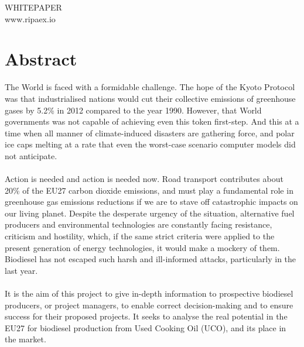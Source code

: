 \documentclass[11pt,fleqn]{book} %
\begin{document}

\begingroup
\thispagestyle{empty}
\vfill
\vfill
\begin{center}
	\color{silver} \LARGE WHITEPAPER \\
	\color{silver} \large www.ripaex.io
\end{center}
\endgroup

\newpage
\section{Abstract}
The World is faced with a formidable challenge. The hope of the Kyoto Protocol was that
industrialised nations would cut their collective emissions of greenhouse gases by 5.2\% in
2012 compared to the year 1990. However, that World governments was not capable of achieving 
even this token first-step. And this at a time when all manner of
climate-induced disasters are gathering force, and polar ice caps melting at a rate that even
the worst-case scenario computer models did not anticipate.\\\\
Action is needed and action is needed now. Road transport contributes about 20\% of the
EU27 carbon dioxide emissions, and must play a fundamental role in greenhouse gas
emissions reductions if we are to stave off catastrophic impacts on our living planet. Despite
the desperate urgency of the situation, alternative fuel producers and environmental
technologies are constantly facing resistance, criticism and hostility, which, if the same strict
criteria were applied to the present generation of energy technologies, it would make a
mockery of them. Biodiesel has not escaped such harsh and ill-informed attacks, particularly
in the last year.\\\\
It is the aim of this project to give in-depth information to prospective biodiesel producers,
or project managers, to enable correct decision-making and to ensure success for their
proposed projects. It seeks to analyse the real potential in the EU27 for biodiesel production
from Used Cooking Oil (UCO), and its place in the market.
\end{document}
